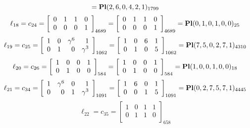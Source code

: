 \documentclass{article}
\begin{document}
{$$={\rm\bf Pl}(2,6,0,4,2,1 )_{1799}$$
$$
\ell_{18} = c_{24} = 
\left[
\begin{array}{*{4}{r}}
0 & 1 & 1 & 0\\
0 & 0 & 0 & 1\\
\end{array}
\right]
_{4689}
=
\left[
\begin{array}{*{4}c}
0  & 1  & 1  & 0\\
0  & 0  & 0  & 1\\
\end{array}
\right]_{4689}
={\rm\bf Pl}(0,1,0,1,0,0 )_{25}$$
$$
\ell_{19} = c_{25} = 
\left[
\begin{array}{*{4}{r}}
1 & 0 & \gamma^{6} & 1\\
0 & 1 & 0 & \gamma^{3}\\
\end{array}
\right]
_{1062}
=
\left[
\begin{array}{*{4}c}
1  & 0  & 6  & 1\\
0  & 1  & 0  & 5\\
\end{array}
\right]_{1062}
={\rm\bf Pl}(7,5,0,2,7,1 )_{4310}$$
$$
\ell_{20} = c_{26} = 
\left[
\begin{array}{*{4}{r}}
1 & 0 & 0 & 1\\
0 & 1 & 0 & 0\\
\end{array}
\right]
_{584}
=
\left[
\begin{array}{*{4}c}
1  & 0  & 0  & 1\\
0  & 1  & 0  & 0\\
\end{array}
\right]_{584}
={\rm\bf Pl}(1,0,0,1,0,0 )_{18}$$
$$
\ell_{21} = c_{34} = 
\left[
\begin{array}{*{4}{r}}
1 & \gamma^{6} & 0 & 1\\
0 & 0 & 1 & \gamma^{3}\\
\end{array}
\right]
_{1091}
=
\left[
\begin{array}{*{4}c}
1  & 6  & 0  & 1\\
0  & 0  & 1  & 5\\
\end{array}
\right]_{1091}
={\rm\bf Pl}(0,2,7,5,7,1 )_{4445}$$
$$
\ell_{22} = c_{35} = 
\left[
\begin{array}{*{4}{r}}
1 & 0 & 1 & 1\\
0 & 1 & 1 & 0\\
\end{array}
\right]
_{658}
$$}
\end{document}
